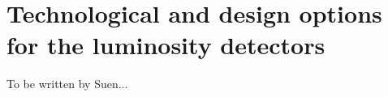 \section{Technological and design options for the luminosity detectors}
\label{sec:lumi_tech}
To be written by Suen...


